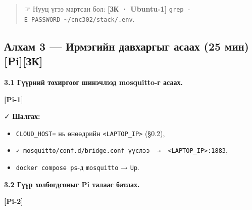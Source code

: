 \begin{quote}
☞ Нууц үгээ мартсан бол: \textbf{{[}ЗК · Ubuntu-1{]}} \texttt{grep\ -E\ \textquotesingle{}PASSWORD\textquotesingle{}\ \textasciitilde{}/cnc302/stack/.env}.
\end{quote}

\hypertarget{ux430ux43bux445ux430ux43c-3-ux438ux440ux43cux44dux433ux438ux439ux43d-ux434ux430ux432ux445ux430ux440ux433ux44bux433-ux430ux441ux430ux430ux445-25-ux43cux438ux43d-piux437ux43a}{%
\subsection{Алхам 3 --- Ирмэгийн давхаргыг асаах (25 мин) {[}Pi{]}{[}ЗК{]}}\label{ux430ux43bux445ux430ux43c-3-ux438ux440ux43cux44dux433ux438ux439ux43d-ux434ux430ux432ux445ux430ux440ux433ux44bux433-ux430ux441ux430ux430ux445-25-ux43cux438ux43d-piux437ux43a}}

\textbf{3.1 Гүүрний тохиргоог шинэчлээд mosquitto-г асаах.}

\textbf{{[}Pi-1{]}}

\begin{Shaded}
\begin{Highlighting}[]
 
\end{Highlighting}
\end{Shaded}

✓ \textbf{Шалгах:}

\begin{itemize}
\tightlist
\item
  \texttt{CLOUD\_HOST=} нь өнөөдрийн \texttt{\textless{}LAPTOP\_\allowbreak{}IP\textgreater{}} (§0.2),
\item
  \texttt{✓\ mosquitto/\allowbreak{}conf.\allowbreak{}d/\allowbreak{}bridge.\allowbreak{}conf\ үүслээ\ \ →\ \ \textless{}LAPTOP\_\allowbreak{}IP\textgreater{}:\allowbreak{}1883},
\item
  \texttt{docker\ compose\ ps}-д \texttt{mosquitto} → \texttt{Up}.
\end{itemize}

\textbf{3.2 Гүүр холбогдсоныг Pi талаас батлах.}

\textbf{{[}Pi-2{]}}

\begin{Shaded}
\begin{Highlighting}[]
\end{Highlighting}
\end{Shaded}

